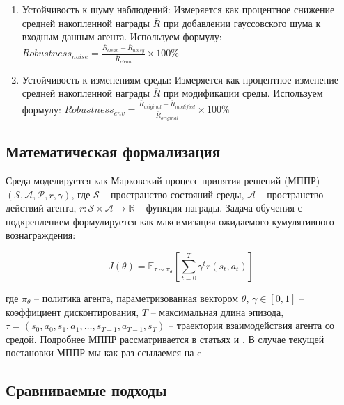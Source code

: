 \begin{enumerate}

  \item Устойчивость к шуму наблюдений: Измеряется как процентное снижение средней накопленной награды $\overline{R}$ при добавлении гауссовского шума к входным данным агента. Используем формулу: $Robustness_{noise} = \frac{\overline{R}_{clean} - \overline{R}_{noisy}}{\overline{R}_{clean}} \times 100\%$

  \item Устойчивость к изменениям среды: Измеряется как процентное изменение средней накопленной награды $\overline{R}$ при модификации среды. Используем формулу: $Robustness_{env} = \frac{\overline{R}_{original} - \overline{R}_{modified}}{\overline{R}_{original}} \times 100\%$

\end{enumerate}

\subsection{Математическая формализация}

Среда моделируется как Марковский процесс принятия решений (МППР) $(\mathcal{S}, \mathcal{A}, \mathcal{P}, r, \gamma)$, где $\mathcal{S}$ -- пространство состояний среды, $\mathcal{A}$ -- пространство действий агента, $r : \mathcal{S} \times \mathcal{A} \rightarrow \mathbb{R}$ -- функция награды. Задача обучения с подкреплением формулируется как максимизация ожидаемого кумулятивного вознаграждения:

\begin{equation}
  \label{eq:rl_fitness}
  J(\theta) = \mathbb{E}_{\tau \sim \pi_{\theta}} \left[ \sum^{T}_{t=0} \gamma^t r(s_t, a_t) \right]
\end{equation}

где $\pi_{\theta}$ -- политика агента, параметризованная вектором $\theta$, $\gamma \in [0, 1]$ -- коэффициент дисконтирования, $T$ -- максимальная длина эпизода, $\tau = (s_0, a_0, s_1, a_1, \ldots, s_{T-1}, a_{T-1}, s_T)$ -- траектория взаимодействия агента со средой. Подробнее МППР рассматривается в статьях \cite{Sutton1998} и \cite{mnih2015humanlevel}. В случае текущей постановки МППР мы как раз ссылаемся на \cite{Sutton1998}e

\subsection{Сравниваемые подходы}

